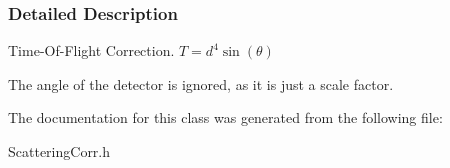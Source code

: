 \subsubsection{Detailed Description}
Time-\/Of-\/Flight Correction. $ T = d^4\sin(\theta) $

The  angle of the detector is ignored, as it is just a scale factor. 

The documentation for this class was generated from the following file:\begin{DoxyCompactItemize}
\item 
ScatteringCorr.h\end{DoxyCompactItemize}
